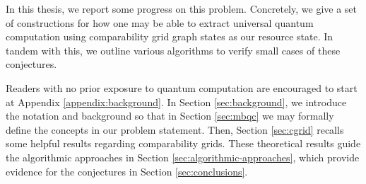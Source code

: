 In this thesis, we report some progress on this problem. Concretely, we give a set of constructions for how one may be able to extract universal quantum computation using comparability grid graph states as our resource state. In tandem with this, we outline various algorithms to verify small cases of these conjectures. 

Readers with no prior exposure to quantum computation are encouraged to start at Appendix \ref{appendix:background}. In Section \ref{sec:background}, we introduce the notation and background so that in Section \ref{sec:mbqc} we may formally define the concepts in our problem statement. Then, Section \ref{sec:cgrid} recalls some helpful results regarding comparability grids. These theoretical results guide the algorithmic approaches in Section \ref{sec:algorithmic-approaches}, which provide evidence for the conjectures in Section \ref{sec:conclusions}.